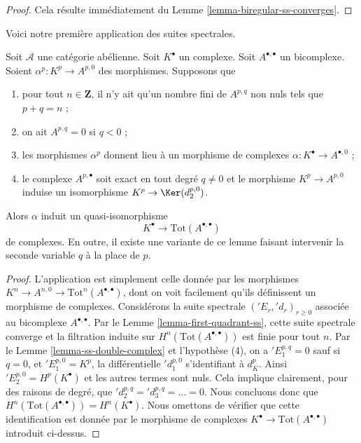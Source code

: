 \begin{proof}
Cela résulte immédiatement du Lemme \ref{lemma-biregular-ss-converges}.
\end{proof}

\noindent
Voici notre première application des suites spectrales.

\begin{lemma}
\label{lemma-double-complex-gives-resolution}
Soit $\mathcal{A}$ une catégorie abélienne.
Soit $K^\bullet$ un complexe.
Soit $A^{\bullet, \bullet}$ un bicomplexe.
Soient $\alpha^p : K^p \to A^{p, 0}$ des morphismes.
Supposons que
\begin{enumerate}
\item pour tout $n \in \mathbf{Z}$, il n'y ait qu'un nombre fini de
$A^{p, q}$ non nuls tels que $p + q = n$ ;
\item on ait $A^{p, q} = 0$ si $q < 0$ ;
\item les morphismes $\alpha^p$ donnent lieu à un morphisme
de complexes $\alpha : K^\bullet \to A^{\bullet, 0}$ ;
\item le complexe $A^{p, \bullet}$ soit exact en tout degré
$q \not = 0$ et le morphisme $K^p \to A^{p, 0}$ induise
un isomorphisme $K^p \to \Ker(d_2^{p, 0})$.
\end{enumerate}
Alors $\alpha$ induit un quasi-isomorphisme
$$
K^\bullet \longrightarrow \text{Tot}(A^{\bullet, \bullet})
$$
de complexes.
En outre, il existe une variante de ce lemme faisant intervenir la seconde
variable $q$ à la place de $p$.
\end{lemma}

\begin{proof}
L'application est simplement celle donnée par les morphismes
$K^n \to A^{n, 0} \to \text{Tot}^n(A^{\bullet, \bullet})$,
dont on voit facilement qu'ils définissent un morphisme de complexes.
Considérons la suite spectrale $({}'E_r, {}'d_r)_{r \geq 0}$
associée au bicomplexe $A^{\bullet, \bullet}$.
Par le Lemme \ref{lemma-first-quadrant-ss}, cette suite spectrale converge
et la filtration induite sur $H^n(\text{Tot}(A^{\bullet, \bullet}))$
est finie pour tout $n$.
Par le Lemme \ref{lemma-ss-double-complex} et l'hypothèse (4), on a
${}'E_1^{p, q} = 0$ sauf si $q = 0$, et $'E_1^{p, 0} = K^p$,
la différentielle ${}'d_1^{p, 0}$ s'identifiant à $d_K^p$.
Ainsi ${}'E_2^{p, 0} = H^p(K^\bullet)$ et les autres termes sont nuls.
Cela implique clairement, pour des raisons de degré, que
${}'d_2^{p, q} = {}'d_3^{p, q} = \ldots = 0$.
Nous concluons donc que
$H^n(\text{Tot}(A^{\bullet, \bullet})) = H^n(K^\bullet)$.
Nous omettons de vérifier que cette identification est donnée par le
morphisme de complexes $K^\bullet \to \text{Tot}(A^{\bullet, \bullet})$
introduit ci-dessus.
\end{proof}

